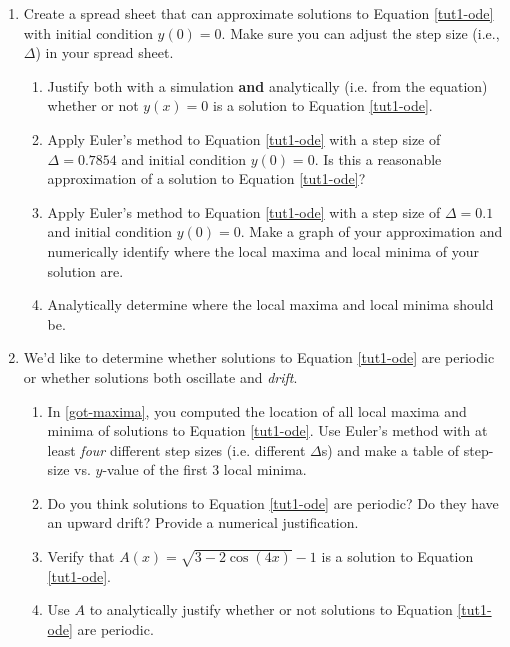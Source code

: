 		\begin{enumerate}
			\item Create a spread sheet that can approximate solutions to Equation \eqref{tut1-ode} with initial condition $y(0)=0$. Make sure you
			can adjust the step size (i.e., $\Delta$) in your spread sheet.
				\begin{enumerate}
					\item Justify both with a simulation \textbf{and} analytically (i.e. from the equation) whether or not $y(x)=0$
					is a solution to Equation \eqref{tut1-ode}.
				\item Apply Euler's method to Equation \eqref{tut1-ode} with a step size of $\Delta=0.7854$ and initial condition $y(0)=0$. Is this a reasonable approximation
					of a solution to Equation \eqref{tut1-ode}?
				\item Apply Euler's method to Equation \eqref{tut1-ode} with a step size of $\Delta=0.1$ and initial condition $y(0)=0$. Make a graph of your approximation
					and numerically identify where the local maxima and local minima of your solution are.
					\item Analytically determine where the local maxima and
					local minima should be.
					\label{got-maxima}
				\end{enumerate}

			\item We'd like to determine whether solutions to Equation \eqref{tut1-ode} are periodic or whether solutions both oscillate and \emph{drift}.
				\begin{enumerate}
					\item In \ref{got-maxima}, you computed the location of all local maxima and minima of solutions to Equation \eqref{tut1-ode}.
					Use Euler's method with at least \emph{four} different step sizes (i.e. different $\Delta$s) and make a table of step-size vs. 
					$y$-value of the first 3 local minima.
					\item Do you think solutions to Equation \eqref{tut1-ode} are periodic? Do they have an upward drift? Provide a numerical justification.
					\item Verify that $A(x)=\sqrt{3-2\cos(4x)}-1$ is a solution to Equation \eqref{tut1-ode}.
					\item Use $A$ to analytically justify whether or not solutions to Equation \eqref{tut1-ode} are periodic.
				\end{enumerate}


\end{enumerate}
